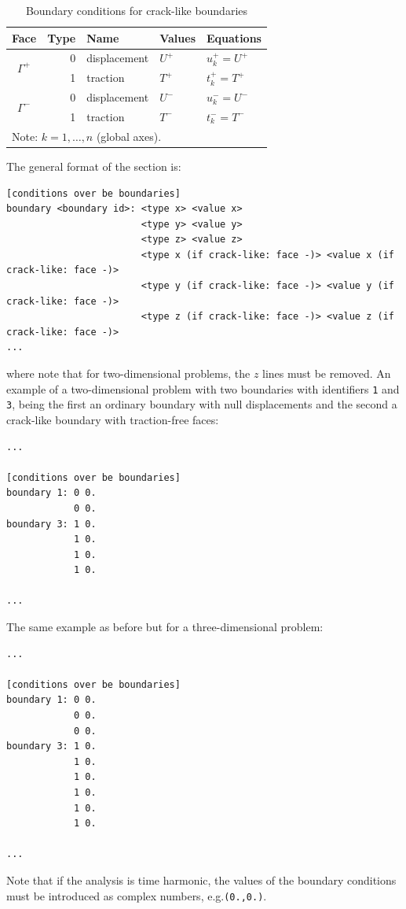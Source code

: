 \documentclass[a4paper,fleqn]{book}
\begin{document}
\begin{table}[h]
\centering
{\footnotesize
\begin{tabular}{crlll}
\textbf{Face} & \textbf{Type} & \textbf{Name} & \textbf{Values} & \textbf{Equations} \\
\midrule
\multirow{2}{*}{$\Gamma^+$} & 0 & displacement & $U^+$ & $u_k^+=U^+$ \\
\cline{2-5}
                            & 1 & traction     & $T^+$ & $t_k^+=T^+$ \\
\hline
\multirow{2}{*}{$\Gamma^-$} & 0 & displacement & $U^-$ & $u_k^-=U^-$ \\
\cline{2-5}
                            & 1 & traction     & $T^-$ & $t_k^-=T^-$ \\
\midrule
\multicolumn{5}{l}{Note: $k=1,\ldots,n$ (global axes).} \\
\end{tabular}
}
\caption{Boundary conditions for crack-like boundaries}
\label{tab:bc_crack_viscoelastic}
\end{table}

The general format of the section is:
\begin{Verbatim}[frame=single, fontsize=\small, label={general format of section [symmetry planes]}]
[conditions over be boundaries]
boundary <boundary id>: <type x> <value x>
                        <type y> <value y>
                        <type z> <value z>
                        <type x (if crack-like: face -)> <value x (if crack-like: face -)>
                        <type y (if crack-like: face -)> <value y (if crack-like: face -)>
                        <type z (if crack-like: face -)> <value z (if crack-like: face -)>
...
\end{Verbatim} 
where note that for two-dimensional problems, the $z$ lines must be removed. An example of a two-dimensional problem with two boundaries with identifiers \texttt{1} and \texttt{3}, being the first an ordinary boundary with null displacements and the second a crack-like boundary with traction-free faces:
\begin{Verbatim}[frame=single, fontsize=\small, label={input.dat}]
...

[conditions over be boundaries]
boundary 1: 0 0.
            0 0.
boundary 3: 1 0.
            1 0.
            1 0.
            1 0.
            
...
\end{Verbatim} 
The same example as before but for a three-dimensional problem:
\begin{Verbatim}[frame=single, fontsize=\small, label={input.dat}]
...

[conditions over be boundaries]
boundary 1: 0 0.
            0 0.
            0 0.
boundary 3: 1 0.
            1 0.
            1 0.
            1 0.
            1 0.
            1 0.
            
...
\end{Verbatim} 
Note that if the analysis is time harmonic, the values of the boundary conditions must be introduced as complex numbers, e.g.\texttt{(0.,0.)}.
\end{document}
